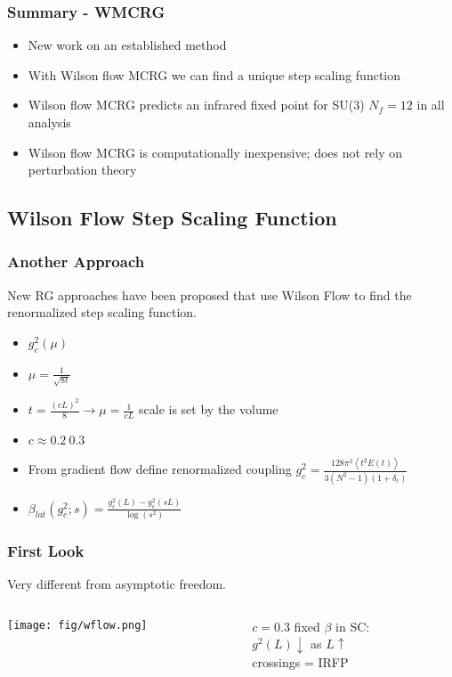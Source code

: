 \begin{frame}
  \frametitle{Summary - WMCRG}
  \begin{itemize}
    \item New work on an established method
    \item With Wilson flow MCRG we can find a unique step scaling function
    \item Wilson flow MCRG predicts an infrared fixed point for SU(3) $N_f=12$ in all analysis
    \item Wilson flow MCRG is computationally inexpensive; does not rely on perturbation theory
  \end{itemize}
\end{frame}

\subsection{Wilson Flow Step Scaling Function}
\addtocounter{framenumber}{-1}

\begin{frame}
  \frametitle{Another Approach}
  New RG approaches have been proposed that use Wilson Flow to find the renormalized step scaling function.
  \begin{itemize}
    \item $g_c^2(\mu)$
    \item $\mu = \frac{1}{\sqrt{8t}}$
    \item $t = \frac{(cL)^2}{8} \rightarrow \mu = \frac{1}{cL}$ scale is set by the volume
    \item $c\approx 0.2~0.3$
    \item From gradient flow define renormalized coupling $g_c^2=\frac{128\pi^2\left<t^2E(t)\right>}{3(N^2-1)(1+\delta_c)}$
    \item $\beta_{lat}(g^2_c; s) = \frac{g^2_c(L) - g^2_c(sL)}{\log(s^2)}$
  \end{itemize}
\end{frame}

\begin{frame}
  \frametitle{First Look}
  Very different from asymptotic freedom.
  \begin{columns}
    \begin{column}{0.65\textwidth}
      \texttt{[image: fig/wflow.png]}
    \end{column}
    \begin{column}{0.35\textwidth}
      \begin{center}
        $c=0.3$
        \vspace{24pt}
        fixed $\beta$ in SC:\\
        $g^2(L) \downarrow$ as $L \uparrow$\\
        \vspace{24pt}
        crossings = IRFP
      \end{center}
    \end{column}
  \end{columns}
\end{frame}

